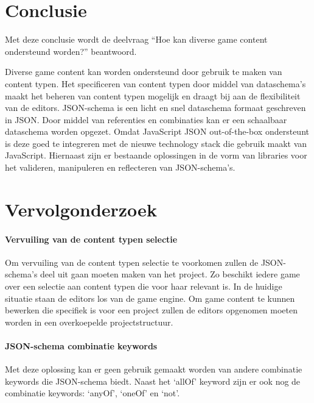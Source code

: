\pagebreak

\section{Conclusie}
Met deze conclusie wordt de deelvraag “Hoe kan diverse game content ondersteund worden?” beantwoord.

Diverse game content kan worden ondersteund door gebruik te maken van content typen. Het specificeren van content typen door middel van dataschema’s maakt het beheren van content typen mogelijk en draagt bij aan de flexibiliteit van de editors. JSON-schema is een licht en snel dataschema formaat geschreven in JSON. Door middel van referenties en combinaties kan er een schaalbaar dataschema worden opgezet. Omdat JavaScript JSON out-of-the-box ondersteunt is deze goed te integreren met de nieuwe technology stack die gebruik maakt van JavaScript. Hiernaast zijn er bestaande oplossingen in de vorm van libraries voor het valideren, manipuleren en reflecteren van JSON-schema’s.

\section{Vervolgonderzoek}
\paragraph{Vervuiling van de content typen selectie}
Om vervuiling van de content typen selectie te voorkomen zullen de JSON-schema’s deel uit gaan moeten maken van het project. Zo beschikt iedere game over een selectie aan content typen die voor haar relevant is. In de huidige situatie staan de editors los van de game engine. Om game content te kunnen bewerken die specifiek is voor een project zullen de editors opgenomen moeten worden in een overkoepelde projectstructuur.

\paragraph{JSON-schema combinatie keywords}
Met deze oplossing kan er geen gebruik gemaakt worden van andere combinatie keywords die JSON-schema biedt. Naast het ‘allOf’ keyword zijn er ook nog de combinatie keywords: ‘anyOf’, ‘oneOf’ en ‘not’.